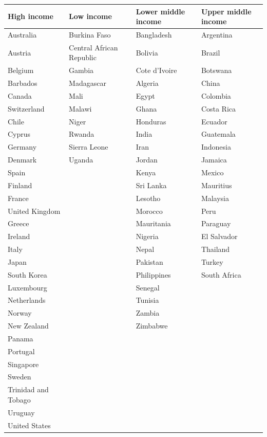 \documentclass[10pt]{beamer}
\begin{document}
\begin{frame}{}
	\centering
			\begin{threeparttable}
				\tiny
				\caption{Income Classification of Countries}
				\begin{tabular}{llll}
					\toprule
					\textbf{High income} & \textbf{Low income} & \textbf{Lower middle income} & \textbf{Upper middle income} \\
					\midrule
					Australia & Burkina Faso & Bangladesh & Argentina \\
					Austria & Central African Republic & Bolivia & Brazil \\
					Belgium & Gambia & Cote d'Ivoire & Botswana \\
					Barbados & Madagascar & Algeria & China \\
					Canada & Mali & Egypt & Colombia \\
					Switzerland & Malawi & Ghana & Costa Rica \\
					Chile & Niger & Honduras & Ecuador \\
					Cyprus & Rwanda & India & Guatemala \\
					Germany & Sierra Leone & Iran & Indonesia \\
					Denmark & Uganda & Jordan & Jamaica \\
					Spain &  & Kenya & Mexico \\
					Finland &  & Sri Lanka & Mauritius \\
					France &  & Lesotho & Malaysia \\
					United Kingdom &  & Morocco & Peru \\
					Greece &  & Mauritania & Paraguay \\
					Ireland &  & Nigeria & El Salvador \\
					Italy &  & Nepal & Thailand \\
					Japan &  & Pakistan & Turkey \\
					South Korea &  & Philippines & South Africa \\
					Luxembourg &  & Senegal &  \\
					Netherlands &  & Tunisia &  \\
					Norway &  & Zambia &  \\
					New Zealand &  & Zimbabwe &  \\
					Panama &  &  &  \\
					Portugal &  &  &  \\
					Singapore &  &  &  \\
					Sweden &  &  &  \\
					Trinidad and Tobago &  &  &  \\
					Uruguay &  &  &  \\
					United States &  &  &  \\
					\bottomrule
				\end{tabular}
\end{threeparttable}
\end{frame}
\end{document}
